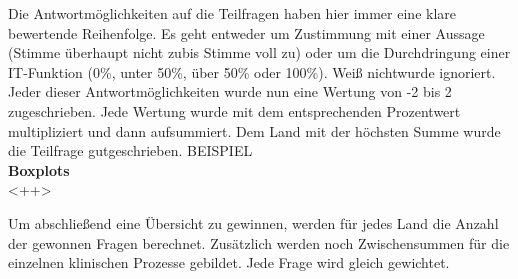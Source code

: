 	Die Antwortmöglichkeiten auf die Teilfragen haben hier immer eine klare bewertende Reihenfolge. Es geht entweder um Zustimmung mit einer Aussage (\glqq Stimme überhaupt nicht zu\grqq{ }bis \glqq Stimme voll zu\grqq) oder um die Durchdringung einer IT-Funktion (0\%, unter 50\%, über 50\% oder 100\%). \glqq Weiß nicht\grqq{ }wurde ignoriert. Jeder dieser Antwortmöglichkeiten wurde nun eine Wertung von -2 bis 2 zugeschrieben. Jede Wertung wurde mit dem entsprechenden Prozentwert multipliziert und dann aufsummiert. Dem Land mit der höchsten Summe wurde die Teilfrage gutgeschrieben.
	BEISPIEL
	\vspace{1ex}\\
	\textbf{Boxplots}\\
	<++>


	Um abschließend eine Übersicht zu gewinnen, werden für jedes Land die Anzahl der gewonnen Fragen berechnet. Zusätzlich werden noch Zwischensummen für die einzelnen klinischen Prozesse gebildet. Jede Frage wird gleich gewichtet. 

